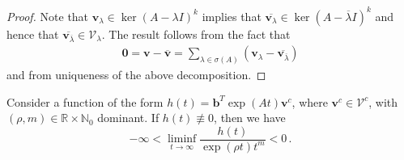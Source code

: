 \begin{proof}
  Note that $\boldsymbol{v}_{\lambda}\in \ker(A-\lambda I)^{k}$
  implies that
  $\overline{\boldsymbol{v}_{\lambda}} \in \ker(A-\overline{\lambda}
  I)^{k}$
  and hence that
  $\overline{ \boldsymbol{v}_{ \overline{\lambda}}} \in
  \mathcal{V}_{\lambda}$.  The result follows from the fact that
\begin{align*}
\boldsymbol{0}=\boldsymbol{v}-\overline{\boldsymbol{v}}=\sum\limits_{\lambda\in \sigma(A)}(\boldsymbol{v}_{\lambda}-\overline{ \boldsymbol{v}_{ \overline{\lambda}}})
\end{align*}
and from uniqueness of the above decomposition.
%
%
\end{proof}

\begin{proposition}
\label{liminfprop}
Consider a function of the form $h(t)=\boldsymbol{b}^{T}\exp(At) \boldsymbol{v}^{c}$, where $\boldsymbol{v}^{c}\in\mathcal{V}^{c}$, with $(\rho,m)\in\mathbb{R}\times \mathbb{N}_{0}$ dominant. If $h(t)\not\equiv 0$, then we have
\begin{equation*}
-\infty<\liminf\limits_{t\rightarrow\infty} \frac{h(t)}{\exp(\rho
  t)t^{m}}<0 \, .
\end{equation*}
\end{proposition}

